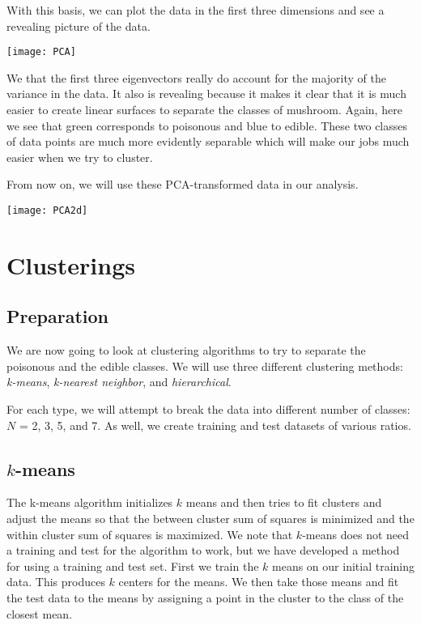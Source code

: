 \documentclass{article}
\begin{document}
With this basis, we can plot the data in the first three dimensions and see a revealing picture of the data.

\begin{center}
\texttt{[image: PCA]}
\end{center}

We that the first three eigenvectors really do account for the majority of the variance in the data. It also is revealing because it makes it clear that it is much easier to create linear surfaces to separate the classes of mushroom. Again, here we see that green corresponds to poisonous and blue to edible. These two classes of data points are much more evidently separable which will make our jobs much easier when we try to cluster. 

From now on, we will use these PCA-transformed data in our analysis. 

\begin{center}
\texttt{[image: PCA2d]}
\end{center}

\section{Clusterings}

\subsection{Preparation}
We are now going to look at clustering algorithms to try to separate the poisonous and the edible classes. We will use three different clustering methods: \emph{k-means}, \emph{k-nearest neighbor}, and \emph{hierarchical}. 

For each type, we will attempt to break the data into different number of classes: $N$ = 2, 3, 5, and 7. As well, we create training and test datasets of various ratios. 

\subsection{$k$-means}

The k-means algorithm initializes $k$ means and then tries to fit clusters and adjust the means so that the between cluster sum of squares is minimized and the within cluster sum of squares is maximized. We note that $k$-means does not need a training and test for the algorithm to work, but we have developed a method for using a training and test set. First we train the $k$ means on our initial training data. This produces $k$ centers for the means. We then take those means and fit the test data to the means by assigning a point in the cluster to the class of the closest mean. 
\end{document}
